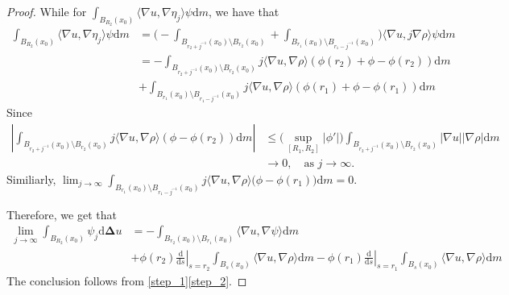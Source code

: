 \documentclass{article}
\theoremstyle{remark}
\numberwithin{equation}{section}
\theoremstyle{definition}
\begin{document}
\begin{proof}
    While for $\int_{B_{R_{2}}(x_{0})} \langle \nabla u, \nabla \eta_{j} \rangle \psi \mathrm{d}m$, we have that
    \begin{equation}
    	\begin{split}
    		\int_{B_{R_{2}}(x_{0})} \langle \nabla u, \nabla \eta_{j} \rangle \psi \mathrm{d}m & = \Big(- \int_{B_{r_{2} + j^{-1}}(x_{0}) \setminus B_{r_{2}}(x_{0})} + \int_{B_{r_{1}}(x_{0}) \setminus B_{r_{1} - j^{-1}}(x_{0})} \Big) \langle \nabla u, j \nabla \rho \rangle \psi \mathrm{d}m\\
    		& = - \int_{B_{r_{2} + j^{-1}}(x_{0}) \setminus B_{r_{2}}(x_{0})} j \langle \nabla u, \nabla \rho \rangle (\phi(r_{2}) + \phi - \phi(r_{2})) \mathrm{d}m\\
    		& + \int_{B_{r_{1}}(x_{0}) \setminus B_{r_{1} - j^{-1}}(x_{0})} j \langle \nabla u, \nabla \rho \rangle (\phi(r_{1}) + \phi - \phi(r_{1})) \mathrm{d}m
    	\end{split}
    \end{equation}
    Since
    \begin{equation}
    	\begin{split}
    		\left| \int_{B_{r_{2} + j^{-1}}(x_{0}) \setminus B_{r_{2}}(x_{0})} j \langle \nabla u, \nabla \rho \rangle (\phi - \phi(r_{2})) \mathrm{d}m \right| & \le \Big(\sup_{[R_{1},R_{2}]} \lvert {\phi}' \rvert\Big) \int_{B_{r_{2} + j^{-1}}(x_{0}) \setminus B_{r_{2}}(x_{0})} \lvert \nabla u \rvert \lvert \nabla \rho \rvert \mathrm{d}m\\
    		& \to 0,\quad \text{as } j \to \infty.
    	\end{split}
    \end{equation}
    Similiarly, $\lim_{j \to \infty} \int_{B_{r_{1}}(x_{0}) \setminus B_{r_{1} - j^{-1}}(x_{0})} j \langle \nabla u, \nabla \rho \rangle \big(\phi - \phi(r_{1})\big) \mathrm{d}m = 0$.
    
    Therefore, we get that 
    \begin{equation}\label{step_2}
    	\begin{split}
    		\lim_{j \to \infty} \int_{B_{R_{2}}(x_{0})} \psi_{j} \mathrm{d}\mathbf{\Delta}u & = - \int_{B_{r_{2}}(x_{0}) \setminus B_{r_{1}}(x_{0})} \langle \nabla u, \nabla \psi \rangle \mathrm{d}m\\
    		& + \phi(r_{2}) \left. \frac{\mathrm{d}}{\mathrm{d}s} \right|_{s = r_{2}} \int_{B_{s}(x_{0})} \langle \nabla u, \nabla \rho \rangle \mathrm{d}m - \phi(r_{1}) \left. \frac{\mathrm{d}}{\mathrm{d}s} \right|_{s = r_{1}} \int_{B_{s}(x_{0})} \langle \nabla u, \nabla \rho \rangle \mathrm{d}m
    	\end{split}
    \end{equation}
    The conclusion follows from \eqref{step_1}\eqref{step_2}.
    \end{proof}
\end{document}
